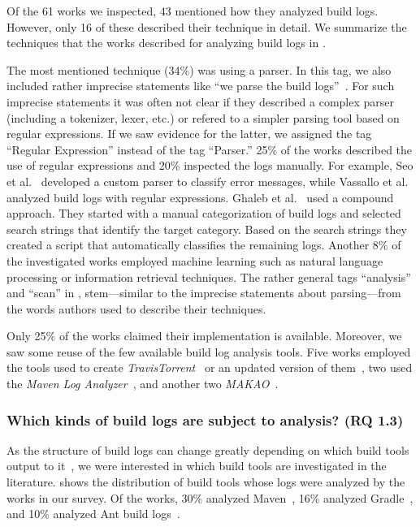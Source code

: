 Of the 61 works we inspected, 43 mentioned how they analyzed
build logs.
However, only 16 of these described their technique in detail.
We summarize the techniques that the works
described for analyzing build logs in .

The most mentioned technique (34\%) was using a parser.
In this tag, we also
included
rather imprecise statements like ``we parse the build
logs''~\cite{rahman2018impact}.
For such imprecise statements it was often not clear if they described
a complex parser (including a tokenizer, lexer, etc.) or refered to a
simpler parsing tool based on regular expressions.
If we saw evidence for the latter, we assigned the tag
``Regular Expression'' instead of the tag ``Parser.''
25\% of the works described the use of regular expressions and 20\%
inspected the logs manually.
For example,
Seo et al.~\cite{seo2014programmers} developed a custom
parser to classify error messages, while Vassallo et
al.~\cite{vassallo2017a-tale} analyzed build logs with regular
expressions.
Ghaleb et al.~\cite{ghaleb2019studying} used a compound approach.
They started with a manual categorization of build logs and selected
search strings that identify the target category.
Based on the search strings they created a script that automatically
classifies the remaining logs.
Another 8\% of the investigated works
employed machine learning such as natural language
processing or information retrieval techniques.
The rather general tags ``analysis'' and ``scan'' in
, stem---similar to the imprecise
statements about parsing---from the
words authors used to describe their techniques.


Only 25\% of the works claimed their implementation is available.
Moreover, we
saw some reuse of the few available build log analysis tools.
Five works employed the tools used to create
\emph{TravisTorrent}~\cite{beller2017travistorrent,beller2017oops,
orellana2017differences,zhao2018comparing} or
an updated version of them~\cite{rott2019empirische,
shi2018evaluating}, two used the
\emph{Maven Log Analyzer}~\cite{macho2018automatically,gallaba2018noise},
and
another two
\emph{MAKAO}~\cite{wen2018blimp,adams2007design,adams2007makao}.

\subsubsection{Which kinds of build logs are subject to
  analysis? (RQ 1.3)}
As the structure of build logs can change greatly depending on which
build tools output to it~\cite{staahl2014modeling},
we were interested in which build tools are
investigated in the literature.
 shows the distribution of
build tools whose logs were analyzed by the works in our survey.
Of the works, 30\% analyzed
Maven~\cite{maven2019website},
16\% analyzed Gradle~\cite{gradle2020website},
and 10\% analyzed Ant build logs~\cite{ant2020website}.

